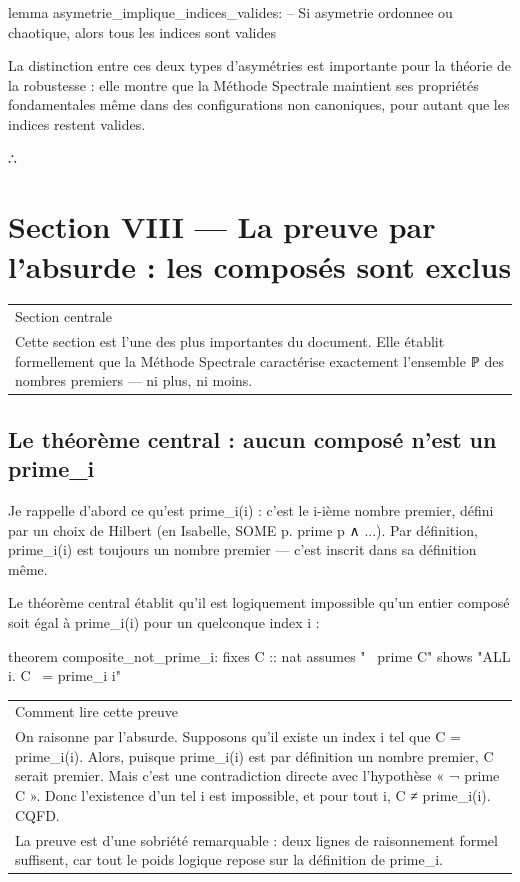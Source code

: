 \documentclass[11pt,a4paper]{article}
\begin{document}
\begin{holcode}[title={Code HOL — Validité des indices en asymétrie}]
lemma asymetrie_implique_indices_valides:
 -- Si asymetrie ordonnee ou chaotique, alors tous les indices sont valides
\end{holcode}

La distinction entre ces deux types d'asymétries est importante pour la théorie de la robustesse : elle montre que la Méthode Spectrale maintient ses propriétés fondamentales même dans des configurations non canoniques, pour autant que les indices restent valides.

∴

\section{Section VIII — La preuve par l'absurde : les composés sont exclus}

\begin{longtable}{|p{}|}
\hline
Section centrale \\ Cette section est l'une des plus importantes du document. Elle établit formellement que la Méthode Spectrale caractérise exactement l'ensemble ℙ des nombres premiers — ni plus, ni moins. \\
\hline
\end{longtable}


\subsection{Le théorème central : aucun composé n'est un prime\_i}

Je rappelle d'abord ce qu'est prime\_i(i) : c'est le i-ième nombre premier, défini par un choix de Hilbert (en Isabelle, SOME p. prime p ∧ ...). Par définition, prime\_i(i) est toujours un nombre premier — c'est inscrit dans sa définition même.

Le théorème central établit qu'il est logiquement impossible qu'un entier composé soit égal à prime\_i(i) pour un quelconque index i :

\begin{holcode}[title={Code HOL — Théorème central d'exclusion des composés}]
theorem composite_not_prime_i:
 fixes C :: nat
 assumes "~ prime C"
 shows "ALL i. C ~= prime_i i"
\end{holcode}


\begin{longtable}{|p{}|}
\hline
Comment lire cette preuve \\ On raisonne par l'absurde. Supposons qu'il existe un index i tel que C = prime\_i(i). Alors, puisque prime\_i(i) est par définition un nombre premier, C serait premier. Mais c'est une contradiction directe avec l'hypothèse « ¬ prime C ». Donc l'existence d'un tel i est impossible, et pour tout i, C ≠ prime\_i(i). CQFD. \\ La preuve est d'une sobriété remarquable : deux lignes de raisonnement formel suffisent, car tout le poids logique repose sur la définition de prime\_i. \\
\hline
\end{longtable}
\end{document}
